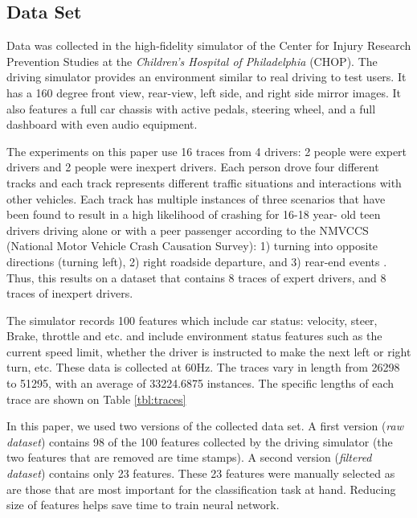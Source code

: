 \documentclass[draft,dvipsnames]{drexel-thesis}
\begin{document}
\begin{thesis}
\chapter{Data Set}\label{chap:dataset}

Data was collected in the high-fidelity simulator \cite{lee2017learning} of the Center for Injury Research Prevention Studies at the \textit{Children's Hospital of Philadelphia} (CHOP). The driving simulator provides an environment similar to real driving to test users. It has a 160 degree front view, rear-view, left side, and right side mirror images. It also features a full car chassis with active pedals, steering wheel, and a full dashboard with even audio equipment.

The experiments on this paper use 16 traces from 4 drivers: 2 people were expert drivers and 2 people were inexpert drivers. Each person drove four different tracks and each track represents different traffic situations and interactions with other vehicles. Each track has multiple instances of three scenarios that have been found to result in a high likelihood of crashing for 16-18 year- old teen drivers driving alone or with a peer passenger according to the NMVCCS (National Motor Vehicle Crash Causation Survey): 1) turning into opposite directions (turning left), 2) right roadside departure, and 3) rear-end events \cite{mcdonald2012using}. Thus, this results on a dataset that contains 8 traces of expert drivers, and 8 traces of inexpert drivers.

The simulator records 100 features which include car status: velocity, steer, Brake, throttle and etc. and include environment status features such as the current speed limit, whether the driver is instructed to make the next left or right turn, etc. These data is collected at 60Hz. The traces vary in length from 26298 to 51295, with an average of 33224.6875 instances. The specific lengths of each trace are shown on Table \ref{tbl:traces}

In this paper, we used two versions of the collected data set. A first version ({\em raw dataset}) contains 98 of the 100 features collected by the driving simulator (the two features that are removed are time stamps). A second version ({\em filtered dataset}) contains only 23 features. These 23 features were manually selected as are those that are most important for the classification task at hand. Reducing size of features helps save time to train neural network.


\end{thesis}
\end{document}

